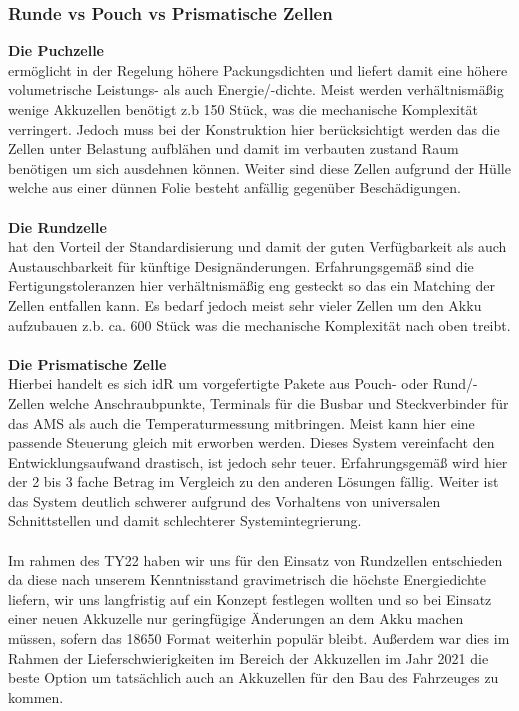\subsubsection{Runde vs Pouch vs Prismatische Zellen}

\textbf{Die Puchzelle}\\
ermöglicht in der Regelung höhere Packungsdichten und liefert damit eine höhere volumetrische Leistungs- als auch Energie/-dichte. Meist werden verhältnismäßig wenige Akkuzellen benötigt z.b 150 Stück, was die mechanische Komplexität verringert. Jedoch muss bei der Konstruktion hier berücksichtigt werden das die Zellen unter Belastung aufblähen und damit im verbauten zustand Raum benötigen um sich ausdehnen können. Weiter sind diese Zellen aufgrund der Hülle welche aus einer dünnen Folie besteht anfällig gegenüber Beschädigungen.\\
\\
\textbf{Die Rundzelle}\\
hat den Vorteil der Standardisierung und damit der guten Verfügbarkeit als auch Austauschbarkeit für künftige Designänderungen. Erfahrungsgemäß sind die Fertigungstoleranzen hier verhältnismäßig eng gesteckt so das ein Matching der Zellen entfallen kann. Es bedarf jedoch meist sehr vieler Zellen um den Akku aufzubauen z.b. ca. 600 Stück was die mechanische Komplexität nach oben treibt.\\
\\
\textbf{Die Prismatische Zelle}\\
Hierbei handelt es sich \ac{idR} um vorgefertigte Pakete aus Pouch- oder Rund/-Zellen welche Anschraubpunkte, Terminals für die Busbar und Steckverbinder für das \ac{AMS} als auch die Temperaturmessung mitbringen. Meist kann hier eine passende Steuerung gleich mit erworben werden. Dieses System vereinfacht den Entwicklungsaufwand drastisch, ist jedoch sehr teuer. Erfahrungsgemäß wird hier der 2 bis 3 fache Betrag im Vergleich zu den anderen Lösungen fällig. Weiter ist das System deutlich schwerer aufgrund des Vorhaltens von universalen Schnittstellen und damit schlechterer Systemintegrierung.\\
\\
Im rahmen des TY22 haben wir uns für den Einsatz von Rundzellen entschieden da diese nach unserem Kenntnisstand gravimetrisch die höchste Energiedichte liefern, wir uns langfristig auf ein Konzept festlegen wollten und so bei Einsatz einer neuen Akkuzelle nur geringfügige Änderungen an dem Akku machen müssen, sofern das 18650 Format weiterhin populär bleibt. Außerdem war dies im Rahmen der Lieferschwierigkeiten im Bereich der Akkuzellen im Jahr 2021 die beste Option um tatsächlich auch an Akkuzellen für den Bau des Fahrzeuges zu kommen.

